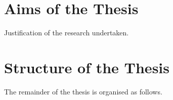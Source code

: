 \section{Aims of the Thesis} %
\label{sec:aims_of_the_thesis}
Justification of the research undertaken.

\section{Structure of the Thesis} %
\label{sec:structure_of_the_thesis}
The remainder of the thesis is organised as follows.

